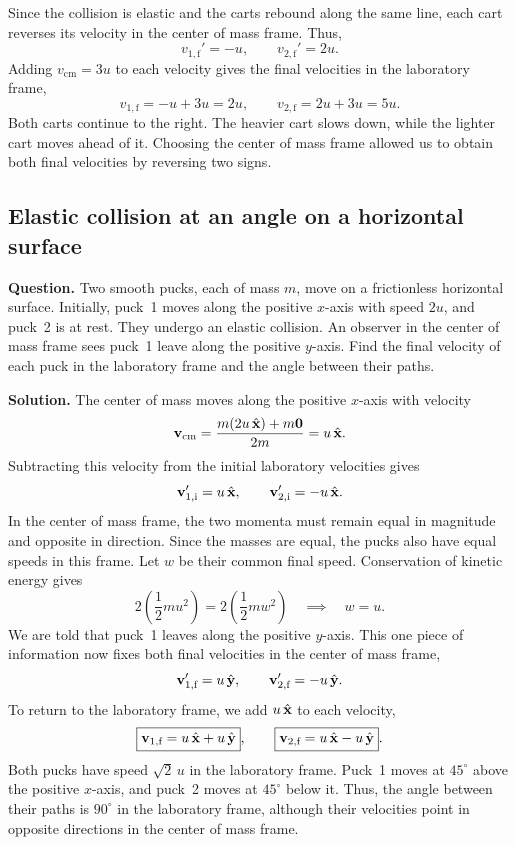 \documentclass[12pt]{article}
\begin{document}
Since the collision is elastic and the carts rebound along the same line, each cart reverses its velocity in the center of mass frame. Thus,
\[
    v_{1,\text{f}}' = -u,
    \qquad
    v_{2,\text{f}}' = 2u.
\]
Adding $v_{\text{cm}}=3u$ to each velocity gives the final velocities in the laboratory frame,
\[
    \boxed{v_{1,\text{f}} = -u+3u = 2u},
    \qquad
    \boxed{v_{2,\text{f}} = 2u+3u = 5u}.
\]
Both carts continue to the right. The heavier cart slows down, while the lighter cart moves ahead of it. Choosing the center of mass frame allowed us to obtain both final velocities by reversing two signs.


\subsection{Elastic collision at an angle on a horizontal surface}

\textbf{Question.}
Two smooth pucks, each of mass $m$, move on a frictionless horizontal surface. Initially, puck~1 moves along the positive $x$-axis with speed $2u$, and puck~2 is at rest. They undergo an elastic collision. An observer in the center of mass frame sees puck~1 leave along the positive $y$-axis. Find the final velocity of each puck in the laboratory frame and the angle between their paths.

\textbf{Solution.}
The center of mass moves along the positive $x$-axis with velocity
\[
    \vb{v}_{\text{cm}}
    = \frac{m(2u\,\hat{\vb{x}})+m\vb{0}}{2m}
    = u\,\hat{\vb{x}}.
\]
Subtracting this velocity from the initial laboratory velocities gives
\[
    \vb{v}_{1,\text{i}}' = u\,\hat{\vb{x}},
    \qquad
    \vb{v}_{2,\text{i}}' = -u\,\hat{\vb{x}}.
\]
In the center of mass frame, the two momenta must remain equal in magnitude and opposite in direction. Since the masses are equal, the pucks also have equal speeds in this frame. Let $w$ be their common final speed. Conservation of kinetic energy gives
\[
    2\left(\frac{1}{2}mu^2\right)
    = 2\left(\frac{1}{2}mw^2\right)
    \quad\implies\quad w=u.
\]
We are told that puck~1 leaves along the positive $y$-axis. This one piece of information now fixes both final velocities in the center of mass frame,
\[
    \vb{v}_{1,\text{f}}' = u\,\hat{\vb{y}},
    \qquad
    \vb{v}_{2,\text{f}}' = -u\,\hat{\vb{y}}.
\]
To return to the laboratory frame, we add $u\,\hat{\vb{x}}$ to each velocity,
\[
    \boxed{\vb{v}_{1,\text{f}} = u\,\hat{\vb{x}}+u\,\hat{\vb{y}}},
    \qquad
    \boxed{\vb{v}_{2,\text{f}} = u\,\hat{\vb{x}}-u\,\hat{\vb{y}}}.
\]
Both pucks have speed $\sqrt{2}\,u$ in the laboratory frame. Puck~1 moves at $45^\circ$ above the positive $x$-axis, and puck~2 moves at $45^\circ$ below it. Thus, the angle between their paths is $\boxed{90^\circ}$ in the laboratory frame, although their velocities point in opposite directions in the center of mass frame.
\end{document}
